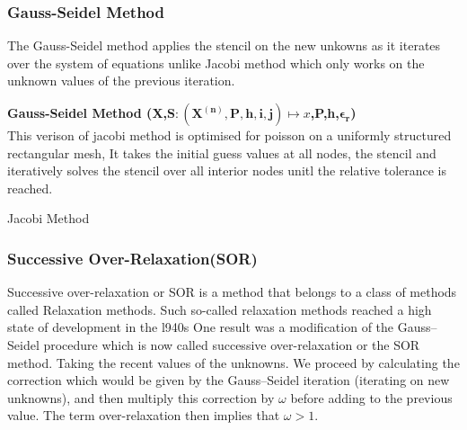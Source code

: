 \subsubsection{Gauss-Seidel Method}
The Gauss-Seidel method applies the stencil on the new unkowns as it iterates over the system of equations unlike Jacobi method which only works on the unknown values of the previous iteration.\\[2mm]
\begin{algorithm}
    \textbf{Gauss-Seidel Method (X,$\mathbf{S:(X^{(n)},P,h,i,j)} \mapsto x$,P,h,$\mathbf{\epsilon_r}$)}\\[-1pt]
    This verison of jacobi method is optimised for poisson on a uniformly structured rectangular mesh, It takes the initial guess values at all nodes, the stencil and iteratively solves the stencil over all interior nodes unitl the relative tolerance is reached.  \\[2mm]
    \caption{Jacobi Method}
\end{algorithm}
\subsubsection{Successive Over-Relaxation(SOR)}


Successive over-relaxation or SOR is a method that belongs to a class of methods called Relaxation methods. 
Such so-called relaxation methods reached a high state of development in the l940s One result was a modiﬁcation of the Gauss–Seidel procedure which is now called successive over-relaxation or the SOR method.
Taking the recent values of the unknowns. We proceed by calculating the correction which would be given by the Gauss–Seidel iteration (iterating on new unknowns), and then multiply this correction by $\omega$ before adding to the previous value. The term over-relaxation then implies that $\omega>1$. \\[2mm]

